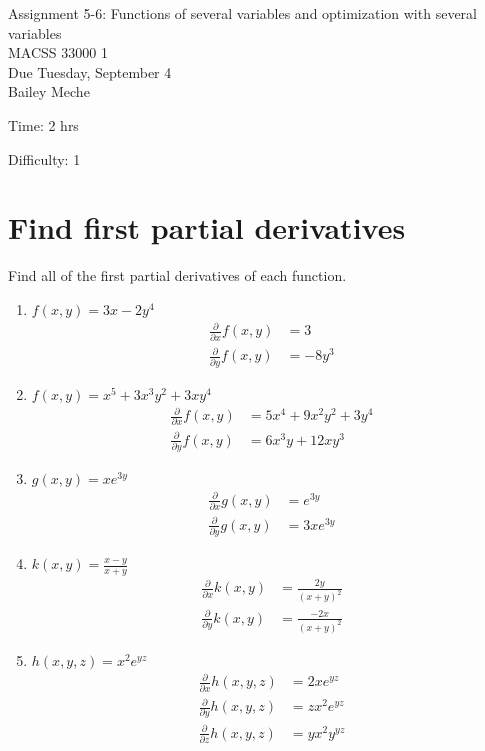 \documentclass[12pt]{article}
\begin{document}
	\begin{center}
		Assignment 5-6: Functions of several variables and optimization with several variables\\
        MACSS 33000 1 \\
		Due Tuesday, September 4 \\
       Bailey Meche
	\end{center}

Time: 2 hrs

Difficulty: 1

\section{Find first partial derivatives}
Find all of the first partial derivatives of each function.

\begin{enumerate}
    \item $f(x,y) = 3x -2y^4 $
        \begin{align*}
            \frac{\partial}{\partial x}f(x,y) &=3
            \\ \frac{\partial }{\partial y}f(x,y) &= -8y^3
        \end{align*}
    \item $f(x,y) = x^5 + 3x^3y^2 + 3xy^4$
        \begin{align*}
        \frac{\partial}{\partial x}f(x,y) &=5x^4 + 9x^2y^2+3y^4
        \\ \frac{\partial }{\partial y}f(x,y) &= 6x^3y+12xy^3
        \end{align*}
    \item $g(x,y) = xe^{3y}$
        \begin{align*}
            \frac{\partial}{\partial x}g(x,y) &=e^{3y}
        \\ \frac{\partial }{\partial y}g(x,y) &=3xe^{3y} 
        \end{align*}
    \item $k(x,y) = \frac{x-y}{x+y}$
    \begin{align*}
        \frac{\partial }{\partial x}k(x,y) &= \frac{2y}{(x+y)^2}
        \\ \frac{\partial }{\partial y}k(x,y) &= \frac{-2x }{(x+y)^2}
    \end{align*}
    \item $h(x,y,z)= x^2e^{yz}$
        \begin{align*}
            \frac{\partial }{\partial x}h(x,y,z) &= 2xe^{yz}
            \\ \frac{\partial }{\partial y}h(x,y,z) &= zx^2 e^{yz}
            \\ \frac{\partial }{\partial z}h(x,y,z) &= yx^2 y^{yz}
        \end{align*}
\end{enumerate}
\end{document}
